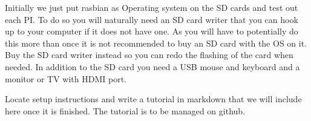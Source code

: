Initially we just put rasbian as Operating system on the SD cards and
test out each PI. To do so you will naturally need an SD card writer
that you can hook up to your computer if it does not have one. As you
will have to potentially do this more than once it is not recommended
to buy an SD card with the OS on it. Buy the SD card writer instead so
you can redo the flashing of the card when needed. In addition to the
SD card you need a USB mouse and keyboard and a monitor or TV with
HDMI port.

Locate setup instructions and write  a tutorial in markdown that we
will include here once it is finished. The tutorial is to be managed
on github.


